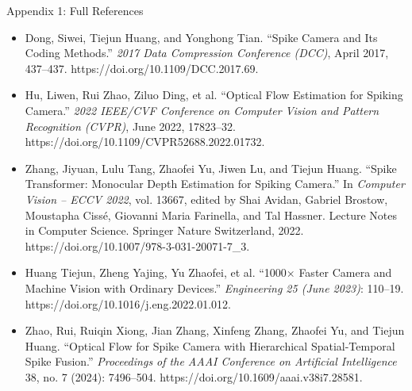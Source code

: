 \documentclass[final]{beamer}
\begin{document}
\begin{frame}[t]{Appendix 1: Full References}


\vspace{10cm}
\begin{center}
\begin{minipage}{0.85\linewidth}
\Large
\setlength{\itemsep}{1.2cm}
\begin{itemize}
\item[\hypertarget{ref:1}{\textbf{[1]}}] Dong, Siwei, Tiejun Huang, and Yonghong Tian. “Spike Camera and Its Coding Methods.” \textit{2017 Data Compression Conference (DCC)}, April 2017, 437–437. https://doi.org/10.1109/DCC.2017.69.
\item[\hypertarget{ref:2}{\textbf{[2]}}] Hu, Liwen, Rui Zhao, Ziluo Ding, et al. “Optical Flow Estimation for Spiking Camera.” \textit{2022 IEEE/CVF Conference on Computer Vision and Pattern Recognition (CVPR)}, June 2022, 17823–32. https://doi.org/10.1109/CVPR52688.2022.01732.
\item[\hypertarget{ref:3}{\textbf{[3]}}] Zhang, Jiyuan, Lulu Tang, Zhaofei Yu, Jiwen Lu, and Tiejun Huang. “Spike Transformer: Monocular Depth Estimation for Spiking Camera.” In \textit{Computer Vision – ECCV 2022}, vol. 13667, edited by Shai Avidan, Gabriel Brostow, Moustapha Cissé, Giovanni Maria Farinella, and Tal Hassner. Lecture Notes in Computer Science. Springer Nature Switzerland, 2022. https://doi.org/10.1007/978-3-031-20071-7\_3.
\item[\hypertarget{ref:4}{\textbf{[4]}}] Huang Tiejun, Zheng Yajing, Yu Zhaofei, et al. “1000× Faster Camera and Machine Vision with Ordinary Devices.” \textit{Engineering 25 (June 2023)}: 110–19. https://doi.org/10.1016/j.eng.2022.01.012.
\item[\hypertarget{ref:5}{\textbf{[5]}}] Zhao, Rui, Ruiqin Xiong, Jian Zhang, Xinfeng Zhang, Zhaofei Yu, and Tiejun Huang. “Optical Flow for Spike Camera with Hierarchical Spatial-Temporal Spike Fusion.” \textit{Proceedings of the AAAI Conference on Artificial Intelligence} 38, no. 7 (2024): 7496–504. https://doi.org/10.1609/aaai.v38i7.28581.

\end{itemize}
\end{minipage}
\end{center}
\end{frame}
\end{document}
